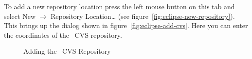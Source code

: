 \documentclass{extex-doc}
\newcommand\menu{\textsf}
\newcommand\sub{\(\rightarrow\) }
\begin{document}
To add a new repository location press the left mouse button on this
tab and select \menu{New \sub Repository Location\ldots} (see
figure~\ref{fig:eclipse-new-repository}). This brings up the dialog
shown in figure~\ref{fig:eclipse-add-cvs}. Here you can enter the
coordinates of the \ExTeX\ CVS repository.
\begin{figure}[htp]
  \hbox{}\hfill
  \hfill
  \caption{Adding the \ExTeX\ CVS Repository}
\end{figure}
\end{document}
